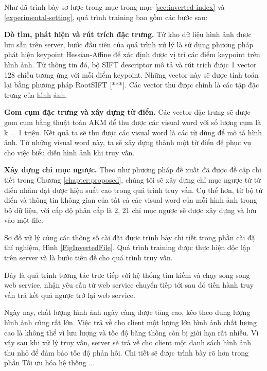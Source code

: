 Như đã trình bày sơ lược trong mục trong mục \ref{sec:inverted-index} và \ref{experimental-setting}, quá trình training bao gồm các bước sau:

\textbf{Dò tìm, phát hiện và rút trích đặc trưng.} Từ kho dữ liệu hình ảnh được lưu sẵn trên server, bước đầu tiên của quá trình xử lý là sử dụng phương pháp phát hiện keypoint Hessian-Affine để xác định được vị trí các điểm keypoint trên hình ảnh. Từ thông tin đó, bộ SIFT descriptor mô tả và rút trích được 1 vector 128 chiều tương ứng với mỗi điểm keypoint. Những vector này sẽ được tính toán lại bằng phương pháp RootSIFT [***]. Các vector thu được chính là các tập đặc trưng của hình ảnh. 

\textbf{Gom cụm đặc trưng và xây dựng từ điển.} Các vector đặc trưng sẽ được gom cụm bằng thuật toán AKM để thu được các visual word với số lượng cụm là k = 1 triệu. Kết quả ta sẽ thu được các visual word là các từ dùng để mô tả hình ảnh. Từ những visual word này, ta sẽ xây dựng thành một từ điển để phục vụ cho việc biểu diễn hình ảnh khi truy vấn.

\textbf{Xây dựng chỉ mục ngược.} Theo như phương pháp đề xuất đã được đề cập chi tiết trong Chương \ref{chapter:proposed}, chúng tôi sẽ xây dựng chỉ mục ngược từ từ điển nhằm đạt được hiệu suất cao trong quá trình truy vấn. Cụ thể hơn, từ bộ từ điển và thông tin không gian của tất cả các visual word của mỗi hình ảnh trong bộ dữ liệu, với cấp độ phân cấp là 2, 21 chỉ mục ngược sẽ được xây dựng và lưu vào một file.

Sơ đồ xử lý cùng các thông số cài đặt được trình bày chi tiết trong phần cài đặ thí nghiệm, Hình \ref{FigInvertedFile}. Quá trình training được thực hiện độc lập trên server và là bước tiền đề cho quá trình truy vấn.

Đây là quá trình tương tác trực tiếp với hệ thống tìm kiếm và chạy song song web service, nhận yêu cầu từ web service chuyển tiếp tới sau đó tiến hành truy vấn trả kết quả ngược trở lại web service.

Ngày nay, chất lượng hình ảnh ngày càng được tăng cao, kéo theo dung lượng hình ảnh cũng rất lớn. Việc trả về cho client một lượng lớn hình ảnh chất lượng cao là không thể vì lưu lượng và tốc độ băng thông còn bị giới hạn rất nhiều. Vì vậy sau khi xử lý truy vấn, server sẽ trả về cho client một danh sách hình ảnh thu nhỏ để đảm bảo tốc độ phản hồi. Chi tiết sẽ được trình bày rõ hơn trong phần Tối ưu hóa hệ thống ...

